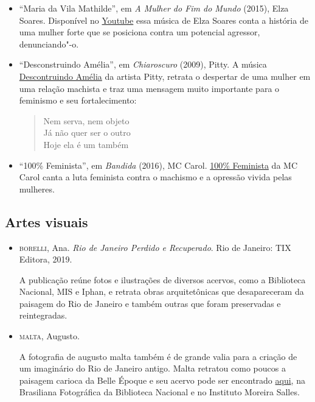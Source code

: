 \documentclass[12pt]{extarticle}
\begin{document}
\begin{itemize}
\item``Maria da Vila Mathilde'', em \emph{A Mulher do Fim do Mundo} (2015), Elza Soares.
Disponível no \href{https://www.youtube.com/watch?v=-09qfhVdzz8&ab_channel=circus}{Youtube} 
essa música de Elza Soares conta a história de uma mulher forte que se posiciona contra 
um potencial agressor, denunciando"-o. 

\item``Desconstruindo Amélia'', em \emph{Chiaroscuro} (2009), Pitty.
A música \href{https://www.youtube.com/watch?v=ygcrcRgVxMI&ab_channel=PittyNews}{Descontruindo Amélia} da artista Pitty, 
retrata o despertar de uma mulher em uma relação machista e traz uma mensagem muito importante para o feminismo e seu 
fortalecimento: 

\begin{verse}
Nem serva, nem objeto\\
Já não quer ser o outro\\
Hoje ela é um também\\
\end{verse}

\item``100\% Feminista'', em \emph{Bandida} (2016), MC Carol.
\href{https://www.youtube.com/watch?v=W05v0B59K5s&ab_channel=McCarolOficial}{100\% Feminista} da MC Carol canta a luta feminista 
contra o machismo e a opressão vivida pelas mulheres. 
\end{itemize}

\subsection{Artes visuais}

\begin{itemize}
\item\textsc{borelli}, Ana. \emph{Rio de Janeiro Perdido e Recuperado}. Rio de Janeiro: TIX
Editora, 2019.

A publicação reúne fotos e ilustrações de diversos acervos, como a Biblioteca Nacional, 
MIS e Iphan, e retrata obras arquitetônicas que desapareceram da paisagem do Rio de 
Janeiro e também outras que foram preservadas e reintegradas.

\item\textsc{malta}, Augusto.

A fotografia de augusto malta também é de grande valia para a criação de um imaginário 
do Rio de Janeiro antigo. Malta retratou como poucos a paisagem carioca da Belle Époque 
e seu acervo pode ser encontrado \href{http://brasilianafotografica.bn.br/?tag=augusto-malta}{aqui}, na Brasiliana Fotográfica da
Biblioteca Nacional e no Instituto Moreira Salles.
\end{itemize}
\end{document}

